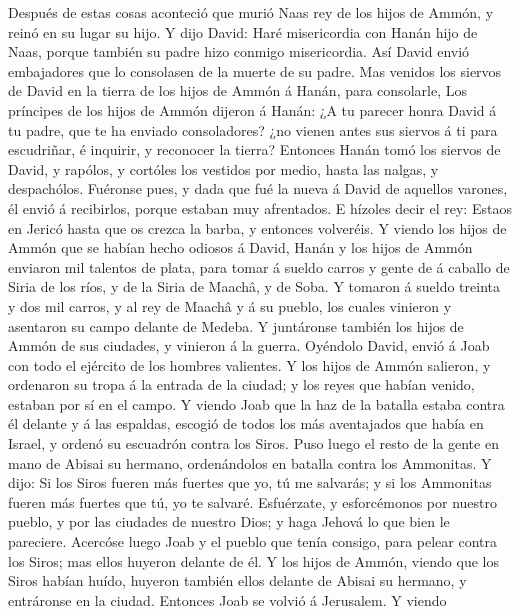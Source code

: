  Después de estas cosas aconteció que murió Naas rey de
los hijos de Ammón, y reinó en su lugar su hijo.  Y dijo
David: Haré misericordia con Hanán hijo de Naas, porque también su padre
hizo conmigo misericordia. Así David envió embajadores que lo consolasen
de la muerte de su padre. Mas venidos los siervos de David en la tierra
de los hijos de Ammón á Hanán, para consolarle,  Los
príncipes de los hijos de Ammón dijeron á Hanán: ¿A tu parecer honra
David á tu padre, que te ha enviado consoladores? ¿no vienen antes sus
siervos á ti para escudriñar, é inquirir, y reconocer la tierra?
 Entonces Hanán tomó los siervos de David, y rapólos, y
cortóles los vestidos por medio, hasta las nalgas, y despachólos.
 Fuéronse pues, y dada que fué la nueva á David de
aquellos varones, él envió á recibirlos, porque estaban muy afrentados.
E hízoles decir el rey: Estaos en Jericó hasta que os crezca la barba, y
entonces volveréis.  Y viendo los hijos de Ammón que se
habían hecho odiosos á David, Hanán y los hijos de Ammón enviaron mil
talentos de plata, para tomar á sueldo carros y gente de á caballo de
Siria de los ríos, y de la Siria de Maachâ, y de Soba.  Y
tomaron á sueldo treinta y dos mil carros, y al rey de Maachâ y á su
pueblo, los cuales vinieron y asentaron su campo delante de Medeba. Y
juntáronse también los hijos de Ammón de sus ciudades, y vinieron á la
guerra.  Oyéndolo David, envió á Joab con todo el ejército
de los hombres valientes.  Y los hijos de Ammón salieron,
y ordenaron su tropa á la entrada de la ciudad; y los reyes que habían
venido, estaban por sí en el campo.  Y viendo Joab que la
haz de la batalla estaba contra él delante y á las espaldas, escogió de
todos los más aventajados que había en Israel, y ordenó su escuadrón
contra los Siros.  Puso luego el resto de la gente en
mano de Abisai su hermano, ordenándolos en batalla contra los Ammonitas.
 Y dijo: Si los Siros fueren más fuertes que yo, tú me
salvarás; y si los Ammonitas fueren más fuertes que tú, yo te salvaré.
 Esfuérzate, y esforcémonos por nuestro pueblo, y por las
ciudades de nuestro Dios; y haga Jehová lo que bien le pareciere.
 Acercóse luego Joab y el pueblo que tenía consigo, para
pelear contra los Siros; mas ellos huyeron delante de él.
 Y los hijos de Ammón, viendo que los Siros habían huído,
huyeron también ellos delante de Abisai su hermano, y entráronse en la
ciudad. Entonces Joab se volvió á Jerusalem.  Y viendo
